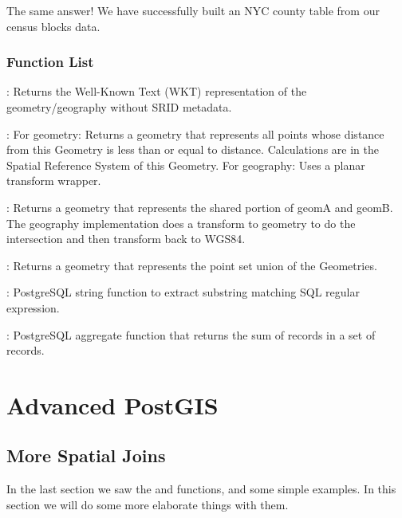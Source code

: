 \documentclass[a4paper,11pt,english]{sphinxmanual}
\begin{document}
The same answer! We have successfully built an NYC county table from our census blocks data.


\subsection{Function List}
\label{\detokenize{basic:id32}}
: Returns the Well-Known Text (WKT) representation of the geometry/geography without SRID metadata.

: For geometry: Returns a geometry that represents all points whose distance from this Geometry is less than or equal to distance. Calculations are in the Spatial Reference System of this Geometry. For geography: Uses a planar transform wrapper.

: Returns a geometry that represents the shared portion of geomA and geomB. The geography implementation does a transform to geometry to do the intersection and then transform back to WGS84.

: Returns a geometry that represents the point set union of the Geometries.

: PostgreSQL string function to extract substring matching SQL regular expression.

: PostgreSQL aggregate function that returns the sum of records in a set of records.


\chapter{Advanced PostGIS}
\label{\detokenize{advanced:advanced-postgis}}\label{\detokenize{advanced::doc}}

\section{More Spatial Joins}
\label{\detokenize{advanced:more-spatial-joins}}\label{\detokenize{advanced:joins-advanced}}
In the last section we saw the  and  functions, and some simple examples. In this section we will do some more elaborate things with them.
\end{document}
